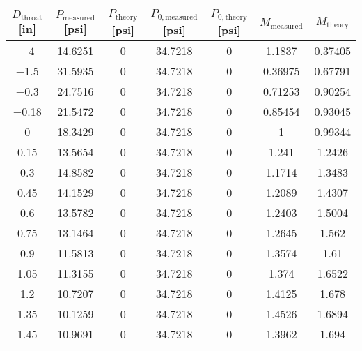 \begin{tabular}{ccccccc}
\toprule
$D_\text{throat}$ [\unit{in}] & $P_\text{measured}$ [\unit{psi}] & $P_\text{theory}$ [\unit{psi}] & $P_{0,\text{measured}}$ [\unit{psi}] & $P_{0,\text{theory}}$ [\unit{psi}] & $M_\text{measured}$ & $M_\text{theory}$ \\
\midrule
\num{-4} & \num{14.6251} & \num{0} & \num{34.7218} & \num{0} & \num{1.1837} & \num{0.37405} \\ 
\num{-1.5} & \num{31.5935} & \num{0} & \num{34.7218} & \num{0} & \num{0.36975} & \num{0.67791} \\ 
\num{-0.3} & \num{24.7516} & \num{0} & \num{34.7218} & \num{0} & \num{0.71253} & \num{0.90254} \\ 
\num{-0.18} & \num{21.5472} & \num{0} & \num{34.7218} & \num{0} & \num{0.85454} & \num{0.93045} \\ 
\num{0} & \num{18.3429} & \num{0} & \num{34.7218} & \num{0} & \num{1} & \num{0.99344} \\ 
\num{0.15} & \num{13.5654} & \num{0} & \num{34.7218} & \num{0} & \num{1.241} & \num{1.2426} \\ 
\num{0.3} & \num{14.8582} & \num{0} & \num{34.7218} & \num{0} & \num{1.1714} & \num{1.3483} \\ 
\num{0.45} & \num{14.1529} & \num{0} & \num{34.7218} & \num{0} & \num{1.2089} & \num{1.4307} \\ 
\num{0.6} & \num{13.5782} & \num{0} & \num{34.7218} & \num{0} & \num{1.2403} & \num{1.5004} \\ 
\num{0.75} & \num{13.1464} & \num{0} & \num{34.7218} & \num{0} & \num{1.2645} & \num{1.562} \\ 
\num{0.9} & \num{11.5813} & \num{0} & \num{34.7218} & \num{0} & \num{1.3574} & \num{1.61} \\ 
\num{1.05} & \num{11.3155} & \num{0} & \num{34.7218} & \num{0} & \num{1.374} & \num{1.6522} \\ 
\num{1.2} & \num{10.7207} & \num{0} & \num{34.7218} & \num{0} & \num{1.4125} & \num{1.678} \\ 
\num{1.35} & \num{10.1259} & \num{0} & \num{34.7218} & \num{0} & \num{1.4526} & \num{1.6894} \\ 
\num{1.45} & \num{10.9691} & \num{0} & \num{34.7218} & \num{0} & \num{1.3962} & \num{1.694} \\ 
\bottomrule
\end{tabular}